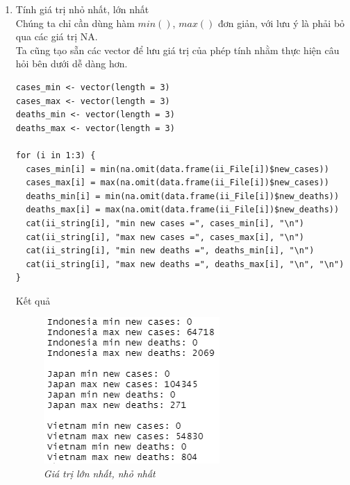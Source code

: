 \documentclass[a4paper]{article}
\theoremstyle{definition}
\begin{document}
\begin{enumerate}[1)]

{\bf Xử lý chung}: Trước hết, ta cần trích lọc dữ liệu cần thiết của 3 quốc gia cần xử lý (Indonesia, Japan, Vietnam), để thuận tiện hơn trong khi thực hiện chương trình. Các câu hỏi là tương đương nhau cho mỗi quốc gia, do đó, chúng ta có thể dùng dòng $for$ để xử lý. \\

{\it Lưu ý: Ở phần trình bày câu ii này, ta quy ước số thứ tự 1, 2, 3 lần lượt tương ứng với Indonesia, Japan, Vietnam.}

\begin{lstlisting}
indoFile <- subset(dataFile, dataFile$location == "Indonesia")
japanFile <- subset(dataFile, dataFile$location == "Japan")
vietnamFile <- subset(dataFile, dataFile$location == "Vietnam") 

ii_File <- list(indoFile, japanFile, vietnamFile)
ii_string <- cbind("Indonesia", "Japan", "Vietnam")
\end{lstlisting}

\item Tính giá trị nhỏ nhất, lớn nhất \\
    Chúng ta chỉ cần dùng hàm $min()$, $max()$ đơn giản, với lưu ý là phải bỏ qua các giá trị NA.\\
    Ta cũng tạo sẵn các vector để lưu giá trị của phép tính nhằm thực hiện câu hỏi bên dưới dễ dàng hơn.
    \begin{lstlisting}
cases_min <- vector(length = 3)
cases_max <- vector(length = 3)
deaths_min <- vector(length = 3)
deaths_max <- vector(length = 3)
    
for (i in 1:3) {
  cases_min[i] = min(na.omit(data.frame(ii_File[i])$new_cases))
  cases_max[i] = max(na.omit(data.frame(ii_File[i])$new_cases))
  deaths_min[i] = min(na.omit(data.frame(ii_File[i])$new_deaths))
  deaths_max[i] = max(na.omit(data.frame(ii_File[i])$new_deaths))
  cat(ii_string[i], "min new cases =", cases_min[i], "\n")
  cat(ii_string[i], "max new cases =", cases_max[i], "\n")
  cat(ii_string[i], "min new deaths =", deaths_min[i], "\n")
  cat(ii_string[i], "max new deaths =", deaths_max[i], "\n", "\n")
}
    \end{lstlisting}
    Kết quả
    \begin{figure}[H]
        \begin{center}
            \includegraphics[scale=0.7]{ii/max min.png}
        \end{center}
        \vspace{+3mm}\caption{\it Giá trị lớn nhất, nhỏ nhất}
    \end{figure}
    

\end{enumerate}
\end{document}
